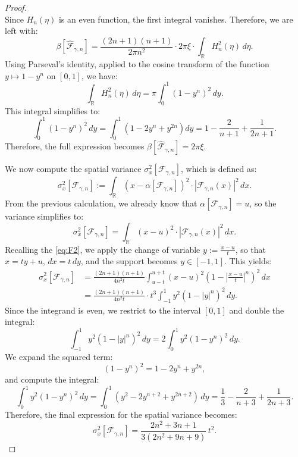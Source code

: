 \documentclass[preprint,hidelinks,authoryear]{elsarticle}
\theoremstyle{plain}
\theoremstyle{definition}
\theoremstyle{remark}
\begin{document}
\begin{proof}
$$$$
Since $ H_n(\eta) $ is an even function, the first integral vanishes. Therefore, we are left with:
$$
\beta[\hat{\mathcal{F}}_{\gamma,n}] = \frac{(2n+1)(n+1)}{2\pi n^2} \cdot 2\pi \xi \cdot \int_{\mathbb{R}} H_n^2(\eta) \, d\eta.
$$
Using Parseval's identity, applied to the cosine transform of the function $ y \mapsto 1 - y^n $ on $[0,1]$, we have:
$$
\int_{\mathbb{R}} H_n^2(\eta) \, d\eta = \pi \int_0^1 (1 - y^n)^2 \, dy.
$$
This integral simplifies to:
$$
\int_0^1 (1 - y^n)^2 \, dy = \int_0^1 \left( 1 - 2y^n + y^{2n} \right) dy = 1 - \frac{2}{n+1} + \frac{1}{2n+1}.
$$
Therefore, the full expression becomes $\beta[\hat{\mathcal{F}}_{\gamma,n}] = 2\pi \xi$.

We now compute the spatial variance $ \sigma_x^2[\mathcal{F}_{\gamma,n}] $, which is defined as:
$$
\sigma_x^2[\mathcal{F}_{\gamma,n}] := \int_{\mathbb{R}} (x - \alpha[\mathcal{F}_{\gamma,n}])^2 \cdot |\mathcal{F}_{\gamma,n}(x)|^2 \, dx.
$$
From the previous calculation, we already know that $ \alpha[\mathcal{F}_{\gamma,n}] = u $, so the variance simplifies to:
$$
\sigma_x^2[\mathcal{F}_{\gamma,n}] = \int_{\mathbb{R}} (x - u)^2 \cdot |\mathcal{F}_{\gamma,n}(x)|^2 \, dx.
$$
Recalling the \eqref{eq:F2}, we apply the change of variable $ y := \frac{x - u}{t} $, so that $ x = t y + u $, $ dx = t \, dy $, and the support becomes $ y \in [-1,1] $. This yields:
$$
\begin{aligned}
\sigma_x^2[\mathcal{F}_{\gamma,n}] 
&= \frac{(2n+1)(n+1)}{4n^2 t} \int_{u - t}^{u + t} (x - u)^2 \left(1 - \left| \frac{x - u}{t} \right|^n \right)^2 \, dx \\
&= \frac{(2n+1)(n+1)}{4n^2 t} \cdot t^3 \int_{-1}^{1} y^2 (1 - |y|^n)^2 \, dy.
\end{aligned}
$$
Since the integrand is even, we restrict to the interval $ [0,1] $ and double the integral:
$$
\int_{-1}^{1} y^2 (1 - |y|^n)^2 \, dy = 2 \int_0^1 y^2 (1 - y^n)^2 \, dy.
$$
We expand the squared term:
$$
(1 - y^n)^2 = 1 - 2y^n + y^{2n},
$$
and compute the integral:
$$
\int_0^1 y^2 (1 - y^n)^2 \, dy = \int_0^1 \left( y^2 - 2y^{n+2} + y^{2n+2} \right) \, dy = \frac{1}{3} - \frac{2}{n+3} + \frac{1}{2n+3}.
$$
Therefore, the final expression for the spatial variance becomes:
$$
\sigma_x^2[\mathcal{F}_{\gamma,n}] = \frac{2 n^2+3n+1}{3 \left(2 n^2+9 n+9\right)}\, t^2 .
$$






\end{proof}
\end{document}
